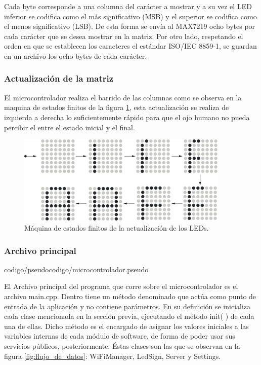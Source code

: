 Cada byte corresponde a una columna del carácter a mostrar y a su vez el LED inferior se codifica como el más significativo (MSB) y el superior se codifica como el menos significativo (LSB). De esta forma se envía al MAX7219 ocho bytes por cada carácter que se desea mostrar en la matriz.
Por otro lado, respetando el orden en que se establecen los caracteres el estándar ISO/IEC 8859-1, se guardan en un archivo los ocho bytes de cada carácter.

\subsubsection{Actualización de la matriz}

El microcontrolador realiza el barrido de las columnas como se observa en la maquina de estados finitos de la figura \ref{fig:fsm-matriz}, esta actualización se realiza de izquierda a derecha lo suficientemente rápido para que el ojo humano no pueda percibir el entre el estado inicial y el final. 

\begin{figure}[ht!]
	\begin{center}
		\centering
		\includegraphics[width=0.9\textwidth]{imagenes/hw/estados-refresh.pdf}
		\caption{Máquina de estados finitos de la actualización de los LEDs.}
		\label{fig:fsm-matriz}
	\end{center}
\end{figure}

\subsubsection{Archivo principal} \label{sec:archivo_principal}

 {codigo/pseudocodigo/microcontrolador.pseudo}

El Archivo principal del programa que corre sobre el microcontrolador es el archivo main.cpp.
Dentro tiene un método denominado  que actúa como punto de entrada de la aplicación y no contiene parámetros.
En su definición se inicializa cada clase mencionada en la sección previa, ejecutando el método init( ) de cada una de ellas.
Dicho método es el encargado de asignar los valores iniciales a las variables internas de cada módulo de software, de forma de poder usar sus servicios públicos, posteriormente.
Éstas clases son las que se observan en la figura \ref{fig:flujo_de_datos}: WiFiManager, LedSign, Server y Settings.

